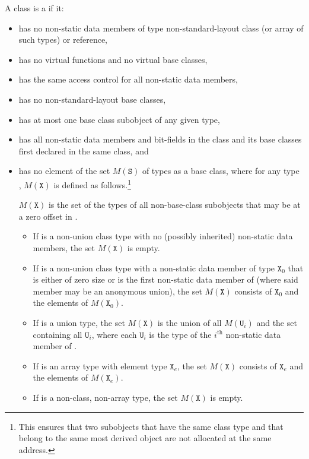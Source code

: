 \pnum
A class  is a  if it:
\begin{itemize}
\item has no non-static data members of type non-standard-layout class
(or array of such types) or reference,

\item has no virtual functions and no
virtual base classes,

\item has the same access control
for all non-static data members,

\item has no non-standard-layout base classes,

\item has at most one base class subobject of any given type,

\item has all non-static data members and bit-fields in the class and
its base classes first declared in the same class, and

\item has no element of the set $M(\mathtt{S})$ of types
as a base class,
where for any type , $M(\mathtt{X})$ is defined as follows.\footnote{
This ensures that two subobjects that have the same class type and that
belong to the same most derived object are not allocated at the same
address.}
\begin{note} $M(\mathtt{X})$ is the set of the types of all non-base-class subobjects
that may be at a zero offset in . \end{note}

\begin{itemize}
\item If  is a non-union class type with no (possibly
inherited) non-static data members, the set
$M(\mathtt{X})$ is empty.

\item If  is a non-union class type with a non-static data
member of type $\mathtt{X}_0$
that is either of zero size or
is the first non-static data member of 
(where said member may be an anonymous union),
the set $M(\mathtt{X})$ consists of $\mathtt{X}_0$ and the elements of
$M(\mathtt{X}_0)$.

\item If  is a union type, the set $M(\mathtt{X})$ is
the union of all $M(\mathtt{U}_i)$ and the set containing all $\mathtt{U}_i$,
where each $\mathtt{U}_i$ is the type of the $i^\text{th}$ non-static data member
of .

\item If  is an array type with element type $\mathtt{X}_e$,
the set $M(\mathtt{X})$ consists of $\mathtt{X}_e$
and the elements of $M(\mathtt{X}_e)$.

\item If  is a non-class, non-array type, the set $M(\mathtt{X})$ is empty.
\end{itemize}
\end{itemize}

